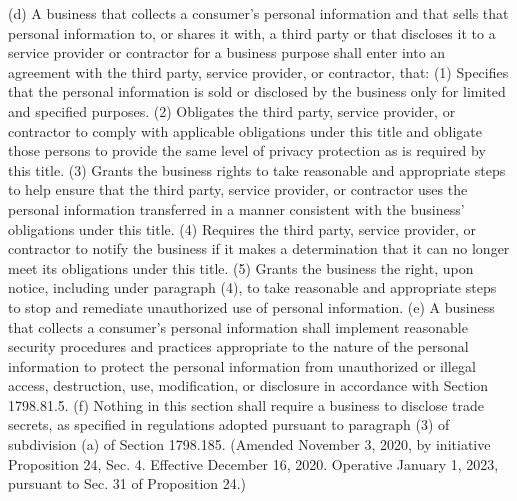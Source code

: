 (d) A business that collects a consumer’s personal information and that sells that personal information to, or shares it with, a third party or that discloses it to a service provider or contractor for a business purpose shall enter into an agreement with the third party, service provider, or contractor, that:
(1) Specifies that the personal information is sold or disclosed by the business only for limited and specified purposes.
(2) Obligates the third party, service provider, or contractor to comply with applicable obligations under this title and obligate those persons to provide the same level of privacy protection as is required by this title.
(3) Grants the business rights to take reasonable and appropriate steps to help ensure that the third party, service provider, or contractor uses the personal information transferred in a manner consistent with the business’ obligations under this title.
(4) Requires the third party, service provider, or contractor to notify the business if it makes a determination that it can no longer meet its obligations under this title.
(5) Grants the business the right, upon notice, including under paragraph (4), to take reasonable and appropriate steps to stop and remediate unauthorized use of personal information.
(e) A business that collects a consumer’s personal information shall implement reasonable security procedures and practices appropriate to the nature of the personal information to protect the personal information from unauthorized or illegal access, destruction, use, modification, or disclosure in accordance with Section 1798.81.5.
(f) Nothing in this section shall require a business to disclose trade secrets, as specified in regulations adopted pursuant to paragraph (3) of subdivision (a) of Section 1798.185.
(Amended November 3, 2020, by initiative Proposition 24, Sec. 4. Effective December 16, 2020. Operative January 1, 2023, pursuant to Sec. 31 of Proposition 24.)

